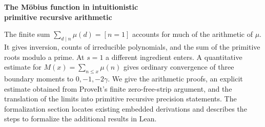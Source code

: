\documentclass[11pt,letterpaper]{article}
\theoremstyle{definition}\newtheorem{definition}[theorem]{Definition}
\theoremstyle{remark}\newtheorem{remark}[theorem]{Remark}
\begin{document}
\thispagestyle{plain}
\par\vspace{8pt}
{\noindent\LARGE\bfseries The M\"obius function in intuitionistic\\[3pt] primitive recursive arithmetic\par}
\vspace{8pt}
\par
\vspace{9pt}
\noindent
The finite sum $\sum_{d\mid n}\mu(d)=[n=1]$ accounts for much of the arithmetic of $\mu$.
It gives inversion, counts of irreducible polynomials, and the sum of the primitive roots modulo a prime.
At $s=1$ a different ingredient enters. A quantitative estimate for
$M(x)=\sum_{n\le x}\mu(n)$ gives ordinary convergence of three boundary
moments to $0,-1,-2\gamma$. We give the arithmetic proofs, an explicit
estimate obtained from ProveIt's finite zero-free-strip argument, and the
translation of the limits into primitive recursive precision statements.
The formalization section locates existing embedded derivations and describes the
steps to formalize the additional results in Lean.
\vspace{3pt}
\begingroup\small\tableofcontents\endgroup
\clearpage








\end{document}
